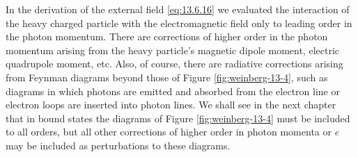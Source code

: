 In the derivation of the external field \eqref{eq:13.6.16} we evaluated the interaction of the heavy charged particle with the electromagnetic field only to
leading order in the photon momentum. There are corrections of higher
order in the photon momentum arising from the heavy particle's magnetic
dipole moment, electric quadrupole moment, etc. Also, of course, there
are radiative corrections arising from Feynman diagrams beyond those of
Figure \ref{fig:weinberg-13-4}, such as diagrams in which photons are emitted and absorbed
from the electron line or electron loops are inserted into photon lines. We
shall see in the next chapter that in bound states the diagrams of Figure
\ref{fig:weinberg-13-4} must be included to all orders, but all other corrections of higher
order in photon momenta or $e$ may be included as perturbations to these
diagrams.



